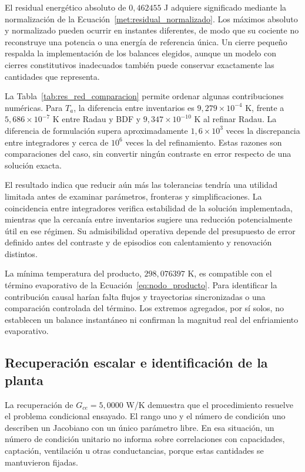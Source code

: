 El residual energético absoluto de $0{,}462455$ J adquiere significado mediante la normalización de la Ecuación~\eqref{met:residual_normalizado}. Los máximos absoluto y normalizado pueden ocurrir en instantes diferentes, de modo que su cociente no reconstruye una potencia o una energía de referencia única. Un cierre pequeño respalda la implementación de los balances elegidos, aunque un modelo con cierres constitutivos inadecuados también puede conservar exactamente las cantidades que representa.

La Tabla~\ref{tab:res_red_comparacion} permite ordenar algunas contribuciones numéricas. Para $T_a$, la diferencia entre inventarios es $9{,}279\times10^{-4}$ K, frente a $5{,}686\times10^{-7}$ K entre Radau y BDF y $9{,}347\times10^{-10}$ K al refinar Radau. La diferencia de formulación supera aproximadamente $1{,}6\times10^3$ veces la discrepancia entre integradores y cerca de $10^6$ veces la del refinamiento. Estas razones son comparaciones del caso, sin convertir ningún contraste en error respecto de una solución exacta.

El resultado indica que reducir aún más las tolerancias tendría una utilidad limitada antes de examinar parámetros, fronteras y simplificaciones. La coincidencia entre integradores verifica estabilidad de la solución implementada, mientras que la cercanía entre inventarios sugiere una reducción potencialmente útil en ese régimen. Su admisibilidad operativa depende del presupuesto de error definido antes del contraste y de episodios con calentamiento y renovación distintos.

La mínima temperatura del producto, $298{,}076397$ K, es compatible con el término evaporativo de la Ecuación~\eqref{eq:nodo_producto}. Para identificar la contribución causal harían falta flujos y trayectorias sincronizadas o una comparación controlada del término. Los extremos agregados, por sí solos, no establecen un balance instantáneo ni confirman la magnitud real del enfriamiento evaporativo.

\subsection{Recuperación escalar e identificación de la planta}

La recuperación de $G_{ce}=5{,}0000$ W/K demuestra que el procedimiento resuelve el problema condicional ensayado. El rango uno y el número de condición uno describen un Jacobiano con un único parámetro libre. En esa situación, un número de condición unitario no informa sobre correlaciones con capacidades, captación, ventilación u otras conductancias, porque estas cantidades se mantuvieron fijadas.

